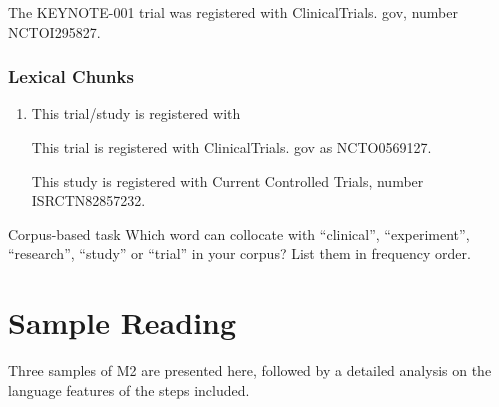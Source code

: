 \documentclass[a4paper]{ctexbook}
\begin{document}
    \begin{eg}{}
      The KEYNOTE-001 trial was registered with ClinicalTrials. gov, number NCTOI295827.  
    \end{eg}

    \subsubsection{Lexical Chunks}

    \begin{enumerate}
      \item This trial/study is registered with
      \begin{eg}{}
        This trial is registered with ClinicalTrials. gov as NCTO0569127.
      \end{eg}

      \begin{eg}{}
        This study is registered with Current Controlled Trials, number ISRCTN82857232.
      \end{eg}
    \end{enumerate}

    \begin{task}{Corpus-based task}
      Which word can collocate with ``clinical'', ``experiment'', ``research'', ``study'' or ``trial'' in your corpus? List them in frequency order.
    \end{task}

\section{Sample Reading}

Three samples of M2 are presented here, followed by a detailed analysis on the language features of the steps included.
\end{document}
